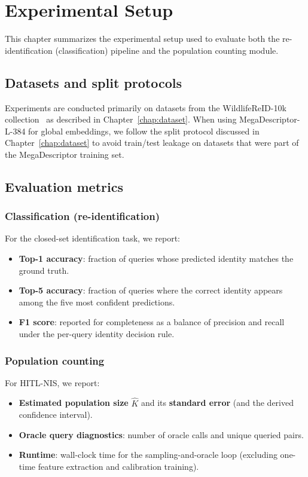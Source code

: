 \chapter{Experimental Setup}
\label{chap:experiments}

This chapter summarizes the experimental setup used to evaluate both the re-identification (classification) pipeline and the population counting module.

\section{Datasets and split protocols}
Experiments are conducted primarily on datasets from the WildlifeReID-10k collection~\cite{adam2025wildlifereid10kwildlifereidentificationdataset} as described in Chapter~\ref{chap:dataset}. When using MegaDescriptor-L-384 for global embeddings, we follow the split protocol discussed in Chapter~\ref{chap:dataset} to avoid train/test leakage on datasets that were part of the MegaDescriptor training set.

\section{Evaluation metrics}
\subsection{Classification (re-identification)}
For the closed-set identification task, we report:
\begin{itemize}
    \item \textbf{Top-1 accuracy}: fraction of queries whose predicted identity matches the ground truth.
    \item \textbf{Top-5 accuracy}: fraction of queries where the correct identity appears among the five most confident predictions.
    \item \textbf{F1 score}: reported for completeness as a balance of precision and recall under the per-query identity decision rule.
\end{itemize}

\subsection{Population counting}
For HITL-NIS, we report:
\begin{itemize}
    \item \textbf{Estimated population size} \(\widehat{K}\) and its \textbf{standard error} (and the derived confidence interval).
    \item \textbf{Oracle query diagnostics}: number of oracle calls and unique queried pairs.
    \item \textbf{Runtime}: wall-clock time for the sampling-and-oracle loop (excluding one-time feature extraction and calibration training).
\end{itemize}

